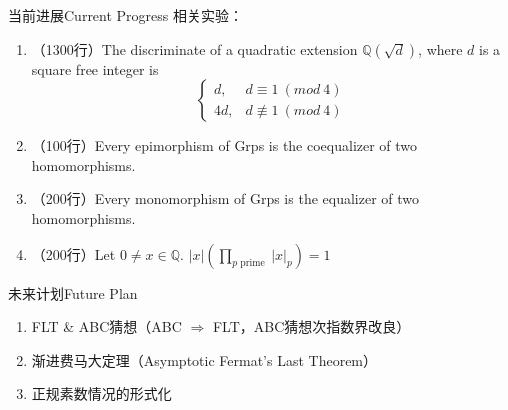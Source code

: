 \documentclass[aspectratio=169]{beamer}
\begin{document}
    \begin{frame}{当前进展}{Current Progress}
    相关实验：
    \begin{enumerate}
    \item （1300行）The discriminate of a quadratic extension $\mathbb{Q}(\sqrt{d})$, where $d$ is a square free integer is
    \[
    \left\{\begin{matrix}
    d,  & d \equiv 1 \ (mod \ 4)\\
    4d,  & d \not\equiv 1 \ (mod \ 4)
    \end{matrix}\right.
    \]
    \item （100行）Every epimorphism of Grps is the coequalizer of two homomorphisms.
    \item （200行）Every monomorphism of Grps is the equalizer of two homomorphisms.
    \item （200行）Let $0 \neq x \in \mathbb{Q}$. $|x| (\prod_{p \text { prime }}|x|_{p})=1$
    \end{enumerate}
    \end{frame}
    
    \begin{frame}{未来计划}{Future Plan}
    \begin{enumerate}
    \item FLT \& ABC猜想（ABC $\Longrightarrow$ FLT，ABC猜想次指数界改良）
    \item 渐进费马大定理（Asymptotic Fermat's Last Theorem）
    \item 正规素数情况的形式化
    \end{enumerate}
    \end{frame}
\end{document}
